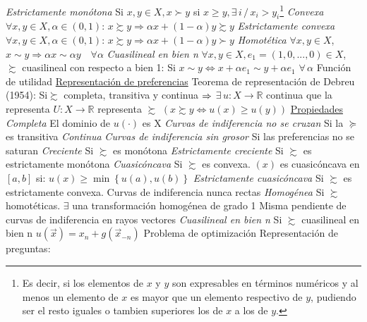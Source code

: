 \documentclass{nuevotema}
\begin{document}
\begin{esquemal}
				\4[(vi)] \textit{Estrictamente monótona}
				\4[] Si $x,y \in X, x \succ y$ si $x \geq y, \exists \, i \, / \, x_i > y_i$\footnote{Es decir, si los elementos de $x$ y $y$ son expresables en términos numéricos y al menos un elemento de $x$ es mayor que un elemento respectivo de $y$, pudiendo ser el resto iguales o tambien superiores los de $x$ a los de $y$.}
				\4[(vii)] \textit{Convexa}
				\4[] $\forall x,y \in X, \alpha \in (0,1)$: $x \succsim y \Rightarrow \alpha x + (1 - \alpha) y \succsim y $
				\4[(viii)] \textit{Estrictamente convexa}
				\4[] $\forall x,y \in X, \alpha \in (0,1)$: $x \succsim y  \Rightarrow \alpha x + (1 - \alpha) y \succ y$
				\4[(ix)] \textit{Homotética}
				\4[] $\forall x, y \in X$, $x \sim y \Rightarrow \alpha  x \sim \alpha y \quad \forall \alpha$
				\4[(x)] \textit{Cuasilineal en bien n}
				\4[] $\forall x, y \in X, e_1 = (1,0,...,0) \in X$, $\succsim$ cuasilineal con respecto a bien 1:
				\4[] Si $x \sim y \iff x + \alpha e_1 \sim  y + \alpha e_1$ $\forall \, \alpha$
			\3 Función de utilidad
				\4 \underline{Representación de preferencias}
				\4 Teorema de representación de Debreu (1954):
				\4[] Si$\succsim$ completa, transitiva y continua
				\4[] $\Rightarrow$ $\exists \, u: X \to \mathbb{R}$ continua que la representa
				\4 $U: X \to \mathbb{R}$ representa $\succsim$
				\4[$\iff$] $\left( x \succsim y \iff u(x) \geq u(y) \right)$
				\4 \underline{Propiedades}
				\4[(i)] \textit{Completa}
				\4[] El dominio de $u(\cdot)$ es X
				\4[(ii)] \textit{Curvas de indiferencia no se cruzan}
				\4[] Si la $\succeq$ es transitiva
				\4[(iii)] \textit{Continua}
				\4[(iv)] \textit{Curvas de indiferencia sin grosor}
				\4[] Si las preferencias no se saturan
				\4[(v)] \textit{Creciente}
				\4[] Si $\succsim$ es monótona
				\4[(vi)] \textit{Estrictamente creciente}
				\4[] Si $\succsim$ es estrictamente monótona
				\4[(vii)] \textit{Cuasicóncava}
				\4[] Si $\succsim$ es convexa.
				\4[] $(x)$ es cuasicóncava en $[a,b]$ si:
				\4[] $u(x) \geq \min \left\lbrace u(a), u(b) \right\rbrace$
				\4[(viii)] \textit{Estrictamente cuasicóncava}
				\4[] Si $\succsim$ es estrictamente convexa.
				\4[] Curvas de indiferencia nunca rectas
				\4[(ix)] \textit{Homogénea}
				\4[] Si $\succsim$ homotéticas.
				\4[] $\exists$ una transformación homogénea de grado 1
				\4[] Misma pendiente de curvas de indiferencia en rayos vectores
				\4[(x)] \textit{Cuasilineal en bien n}
				\4[] Si $\succsim$ cuasilineal en bien n
				\4[] $u(\vec{x}) = x_n +  g(\vec{x}_{-n})$
			\3 Problema de optimización
				\4 Representación de preguntas:

\end{esquemal}
\end{document}
